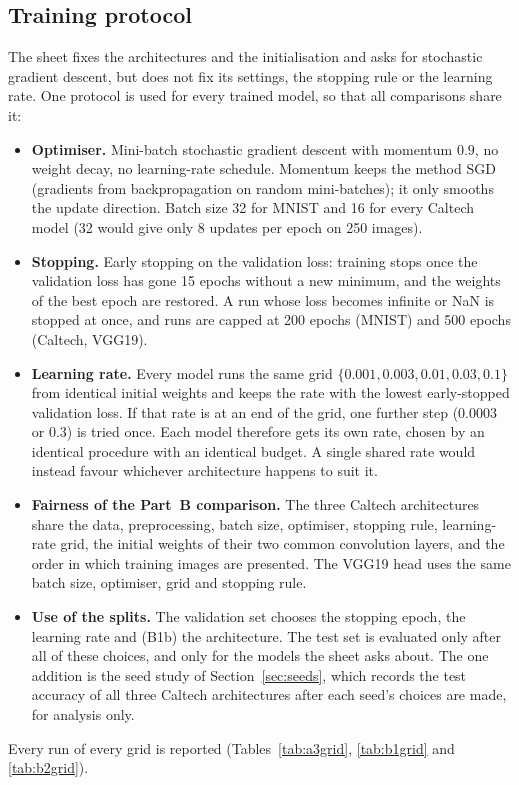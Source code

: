 \documentclass[11pt,a4paper]{article}
\begin{document}
\subsection{Training protocol}\label{sec:protocol}
The sheet fixes the architectures and the initialisation and asks for stochastic gradient descent,
but does not fix its settings, the stopping rule or the learning rate.  One protocol is used for
every trained model, so that all comparisons share it:
\begin{itemize}[leftmargin=*,itemsep=1pt]
\item \textbf{Optimiser.} Mini-batch stochastic gradient descent with momentum $0.9$, no weight
  decay, no learning-rate schedule.  Momentum keeps the method SGD (gradients from
  backpropagation on random mini-batches); it only smooths the update direction.  Batch size 32 for MNIST and 16 for every Caltech model
  (32 would give only 8 updates per epoch on 250 images).
\item \textbf{Stopping.} Early stopping on the validation loss: training stops once the validation
  loss has gone 15 epochs without a new minimum, and the weights of the best epoch are restored.
  A run whose loss becomes infinite or NaN is stopped at once, and runs are capped at 200 epochs
  (MNIST) and 500 epochs (Caltech, VGG19).
\item \textbf{Learning rate.} Every model runs the same grid $\{0.001, 0.003, 0.01, 0.03, 0.1\}$ from
  identical initial weights and keeps the rate with the lowest early-stopped validation loss.  If
  that rate is at an end of the grid, one further step ($0.0003$ or $0.3$) is tried once.  Each
  model therefore gets its own rate, chosen by an identical procedure with an identical budget.  A
  single shared rate would instead favour whichever architecture happens to suit it.
\item \textbf{Fairness of the Part~B comparison.} The three Caltech architectures share the data,
  preprocessing, batch size, optimiser, stopping rule, learning-rate grid, the initial weights of
  their two common convolution layers, and the order in which training images are presented.  The
  VGG19 head uses the same batch size, optimiser, grid and stopping rule.
\item \textbf{Use of the splits.} The validation set chooses the stopping epoch, the learning rate
  and (B1b) the architecture.  The test set is evaluated only after all of these choices, and only
  for the models the sheet asks about.  The one addition is the seed study of
  Section~\ref{sec:seeds}, which records the test accuracy of all three Caltech architectures after
  each seed's choices are made, for analysis only.
\end{itemize}
Every run of every grid is reported (Tables~\ref{tab:a3grid}, \ref{tab:b1grid} and \ref{tab:b2grid}).
\end{document}
